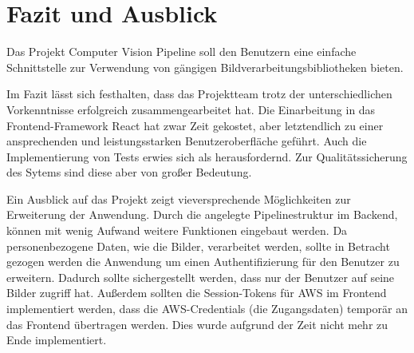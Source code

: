 \section{Fazit und Ausblick}
Das Projekt Computer Vision Pipeline soll den Benutzern eine einfache Schnittstelle zur Verwendung von gängigen Bildverarbeitungsbibliotheken bieten.

Im Fazit lässt sich festhalten, dass das Projektteam trotz der unterschiedlichen Vorkenntnisse erfolgreich zusammengearbeitet hat. Die Einarbeitung in das Frontend-Framework React hat zwar Zeit gekostet, aber letztendlich zu einer ansprechenden und leistungsstarken Benutzeroberfläche geführt. Auch die Implementierung von Tests erwies sich als herausfordernd. Zur Qualitätssicherung des Sytems sind diese aber von großer Bedeutung.

Ein Ausblick auf das Projekt zeigt vieversprechende Möglichkeiten zur Erweiterung der Anwendung. Durch die angelegte Pipelinestruktur im Backend, können mit wenig Aufwand weitere Funktionen eingebaut werden. Da personenbezogene Daten, wie die Bilder, verarbeitet werden, sollte in Betracht gezogen werden die Anwendung um einen Authentifizierung für den Benutzer zu erweitern. Dadurch sollte sichergestellt werden, dass nur der Benutzer auf seine Bilder zugriff hat. Außerdem sollten die Session-Tokens für AWS im Frontend implementiert werden, dass die AWS-Credentials (die Zugangsdaten) temporär an das Frontend übertragen werden. Dies wurde aufgrund der Zeit nicht mehr zu Ende implementiert.